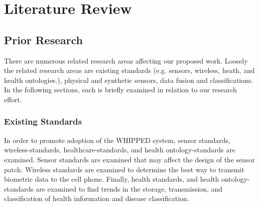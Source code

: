 \chapter{Literature Review}
\label{chap:LitReview}

\section{Prior Research}
\label{sec:priorResearch}
There are numerous related research areas affecting our proposed work. Loosely the related research areas are existing standards (e.g. sensors, wireless, heath, and health ontologies.), physical and synthetic sensors, data fusion and classifications. In the following sections, each is briefly examined in relation to our research effort.

\subsection{Existing Standards}
\label{sebsec:ExistingStandards}
In order to promote adoption of the WHIPPED system, sensor standards, wireless-standards, healthcare-standards, and health ontology-standards are examined. Sensor standards are examined that may affect the design of the sensor patch. Wireless standards are examined to determine the best way to transmit biometric data to the cell phone. Finally, health standards, and health ontology-standards are examined to find trends in the storage, transmission, and classification of health information and disease classification.


